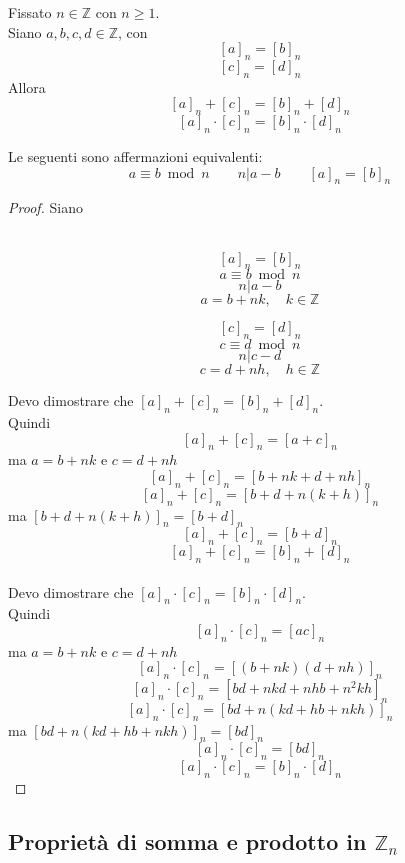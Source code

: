 \documentclass[a4paper,12pt, oneside]{book}
\begin{document}
		\begin{teorema}
			Fissato $n \in \mathbb{Z}$ con $n \geq 1$.\\
			Siano $a,b,c,d \in \mathbb{Z}$, con $$[a]_n = [b]_n$$ $$[c]_n = [d]_n$$
			Allora
			$$[a]_n + [c]_n = [b]_n + [d]_n$$
			$$[a]_n \cdot [c]_n = [b]_n \cdot [d]_n$$
			
			\begin{nota}
				Le seguenti sono affermazioni equivalenti:
				$$a \equiv b \bmod n \qquad n | a-b \qquad [a]_n = [b]_n$$
			\end{nota}
			
			\begin{proof}
				Siano\\\\
				\begin{minipage}{0.45\textwidth}
					$$[a]_n = [b]_n$$
					$$a \equiv b \bmod n$$
					$$n|a-b$$
					$$a = b+nk, \quad k\in \mathbb{Z}$$
				\end{minipage}%
				\hfill
				\begin{minipage}{0.45\textwidth}
					$$[c]_n = [d]_n$$
					$$c \equiv d \bmod n$$
					$$n|c-d$$
					$$c = d+nh, \quad h\in \mathbb{Z}$$
				\end{minipage}%
				
				Devo dimostrare che $[a]_n + [c]_n = [b]_n + [d]_n$.\\
				Quindi
				$$[a]_n + [c]_n = [a+c]_n$$
				ma $a = b+nk$ e $c=d+nh$
				$$[a]_n + [c]_n = [b+nk+d+nh]_n$$
				$$[a]_n + [c]_n = [b+d+n(k+h)]_n$$
				ma $[b+d+n(k+h)]_n = [b+d]_n$
				$$[a]_n + [c]_n = [b+d]_n$$
				$$[a]_n + [c]_n = [b]_n + [d]_n$$\\
				
				Devo dimostrare che $[a]_n \cdot [c]_n = [b]_n \cdot [d]_n$.\\
				Quindi
				$$[a]_n \cdot [c]_n = [ac]_n$$
				ma $a = b+nk$ e $c=d+nh$
				$$[a]_n \cdot [c]_n = [(b+nk)(d+nh)]_n$$
				$$[a]_n \cdot [c]_n = [bd+nkd+nhb+n^2kh]_n$$
				$$[a]_n \cdot [c]_n = [bd+n(kd+hb+nkh)]_n$$
				ma $[bd+n(kd+hb+nkh)]_n = [bd]_n$
				$$[a]_n \cdot [c]_n = [bd]_n$$
				$$[a]_n \cdot [c]_n = [b]_n \cdot [d]_n$$
			\end{proof}
		\end{teorema}
		
		\subsection{Proprietà di somma e prodotto in $\mathbb{Z}_n$}
\end{document}
